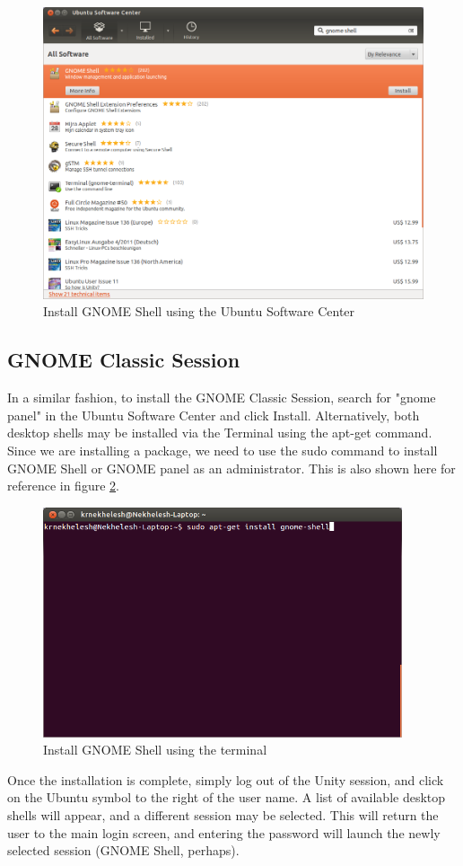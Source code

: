 \begin{figure}[h!]	
	\centering
	\includegraphics[width=350pt]{./images/advanced-topics/gnomeshell1.png}
	\caption{Install GNOME Shell using the Ubuntu Software Center}	
	\label{fig:GNOMEshell1}		
\end{figure}

\subsection*{GNOME Classic Session} 
In a similar fashion, to install the GNOME Classic Session, search for "gnome panel" in the Ubuntu Software Center and click Install. Alternatively, both desktop shells may be installed via the Terminal using the apt-get command. Since we are installing a package, we need to use the sudo command to install GNOME Shell or GNOME panel as an administrator. This is also shown here for reference in figure \ref{fig:GNOMEshell2}.

\begin{figure}[h!]	
	\centering
	\includegraphics[width=300pt]{./images/advanced-topics/gnomeshell2.png}
	\caption{Install GNOME Shell using the terminal}	
	\label{fig:GNOMEshell2}		
\end{figure}

\par \noindent Once the installation is complete, simply log out of the Unity session, and click on the Ubuntu symbol to the right of the user name. A list of available desktop shells will appear, and a different session may be selected. This will return the user to the main login screen, and entering the password will launch the newly selected session (GNOME Shell, perhaps).